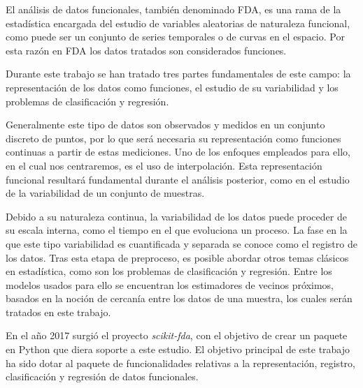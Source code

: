 El análisis de datos funcionales, también denominado FDA, es una rama de la
estadística encargada del estudio de variables aleatorias de naturaleza
funcional, como puede ser un conjunto de series temporales o de curvas en el
espacio. Por esta razón en FDA los datos tratados son considerados funciones.

Durante este trabajo se han tratado tres partes fundamentales de este campo:
la representación de los datos como funciones, el estudio de su variabilidad
y los problemas de clasificación y regresión.

Generalmente este tipo de datos son observados y medidos en un conjunto
discreto de puntos, por lo que será necesaria su representación como
funciones continuas a partir de estas mediciones.
Uno de los enfoques empleados para ello, en el cual nos centraremos, es el uso de interpolación.
Esta representación funcional resultará fundamental durante el análisis posterior,
como en el estudio de la variabilidad de un conjunto de muestras.

Debido a su naturaleza continua, la variabilidad de los datos
puede proceder de su escala interna, como el tiempo en el que evoluciona un
proceso. La fase en la que este tipo variabilidad es cuantificada y separada se
conoce como el registro de los datos. Tras esta etapa de preproceso, es posible
abordar otros temas clásicos en estadística, como son los problemas de
clasificación y regresión. Entre los modelos usados para ello se encuentran los
estimadores de vecinos próximos, basados en la noción de cercanía entre los
datos de una muestra, los cuales serán tratados en este trabajo.

En el año 2017 surgió el proyecto \textit{scikit-fda}, con el objetivo de crear
un paquete en Python que diera soporte a este estudio. El objetivo principal
de este trabajo ha sido dotar al paquete de funcionalidades relativas a la
representación, registro, clasificación y regresión de datos funcionales.



